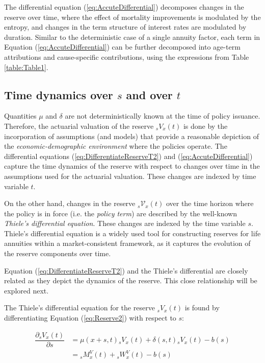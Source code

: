 \documentclass[12pt]{article}
\begin{document}
The differential equation (\ref{eq:AccuteDifferential}) decomposes changes in the reserve over time, where the effect of mortality improvements is modulated by the entropy, and changes in the term structure of interest rates are modulated by duration. Similar to the deterministic case of a single annuity factor, each term in Equation (\ref{eq:AccuteDifferential}) can be further decomposed into age-term attributions and cause-specific contributions, using the expressions from Table \ref{table:Table1}.


\subsection{Time dynamics over $s$ and over $t$}\label{sec:ThieleEquations}


Quantities $\mu$ and $\delta$ are not deterministically known at the time of policy issuance. Therefore, the actuarial valuation of the reserve ${}_sV_x(t)$ is done by the incorporation of assumptions (and models) that provide a reasonable depiction of the \textit{economic-demographic environment} where the policies operate. The differential equations (\ref{eq:DifferentiateReserveT2}) and (\ref{eq:AccuteDifferential}) capture the time dynamics of the reserve with respect to changes over time in the assumptions used for the actuarial valuation. These changes are indexed by time variable $t$.

On the other hand, changes in the reserve \({}_s\mathcal{V}_x(t)\) over the time horizon where the policy is in force (i.e. the \textit{policy term}) are described by the well-known \textit{Thiele's differential equation}. These changes are indexed by the time variable \( s \). Thiele's differential equation is a widely used tool for constructing reserves for life annuities within a market-consistent framework, as it captures the evolution of the reserve components over time.

 
Equation (\ref{eq:DifferentiateReserveT2}) and the Thiele's differential are closely related as they depict the dynamics of the reserve. This close relationship will be explored next.

The Thiele's differential equation for the reserve ${}_sV_x(t)$ is found by differentiating Equation (\ref{eq:Reserve2}) with respect to $s$:

\begin{equation}\label{eq:Thiele}
	\begin{split}
		\dfrac{\partial {}_sV_x(t)}{\partial s}&= \mu(x+s,t){}_sV_x(t) + \delta(s,t){}_sV_x(t) - b(s) \\
		&= {}_sM^V_x(t) + {}_sW^V_x(t) - b(s)
	\end{split}
\end{equation}
\end{document}
